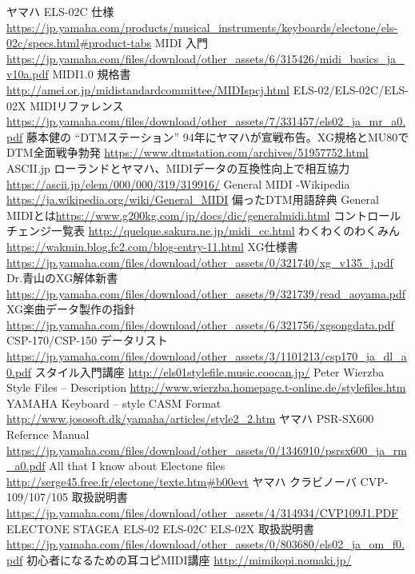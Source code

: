 \documentclass[uplatex, 10pt, dvipdfmx]{jsarticle}
\numberwithin{equation}{section}
\begin{document}
\begin{thebibliography}{99}
 ヤマハ ELS-02C 仕様\url{https://jp.yamaha.com/products/musical_instruments/keyboards/electone/els-02c/specs.html#product-tabs}
 MIDI 入門\url{https://jp.yamaha.com/files/download/other_assets/6/315426/midi_basics_ja_v10a.pdf}
 MIDI1.0 規格書 \url{http://amei.or.jp/midistandardcommittee/MIDIspcj.html}
 ELS-02/ELS-02C/ELS-02X MIDIリファレンス \url{https://jp.yamaha.com/files/download/other_assets/7/331457/els02_ja_mr_a0.pdf}
 藤本健の ``DTMステーション'' 94年にヤマハが宣戦布告。XG規格とMU80でDTM全面戦争勃発 \url{https://www.dtmstation.com/archives/51957752.html}
 ASCII.jp ローランドとヤマハ、MIDIデータの互換性向上で相互協力 \url{https://ascii.jp/elem/000/000/319/319916/}
 General MIDI -Wikipedia \url{https://ja.wikipedia.org/wiki/General_MIDI}
 偏ったDTM用語辞典 General MIDIとは\url{https://www.g200kg.com/jp/docs/dic/generalmidi.html}
 コントロールチェンジ一覧表 \url{http://quelque.sakura.ne.jp/midi_cc.html}
 わくわくのわくみん \url{https://wakmin.blog.fc2.com/blog-entry-11.html}
 XG仕様書 \url{https://jp.yamaha.com/files/download/other_assets/0/321740/xg_v135_j.pdf}
 Dr.青山のXG解体新書 \url{https://jp.yamaha.com/files/download/other_assets/9/321739/read_aoyama.pdf}
 XG楽曲データ製作の指針 \url{https://jp.yamaha.com/files/download/other_assets/6/321756/xgsongdata.pdf}
 CSP-170/CSP-150 データリスト \url{https://jp.yamaha.com/files/download/other_assets/3/1101213/csp170_ja_dl_a0.pdf}
 スタイル入門講座 \url{http://els01stylefile.music.coocan.jp/}
 Peter Wierzba Style Files -- Description \url{http://www.wierzba.homepage.t-online.de/stylefiles.htm}
 YAMAHA Keyboard -- style CASM Format \url{http://www.jososoft.dk/yamaha/articles/style2_2.htm}
 ヤマハ PSR-SX600 Refernce Manual \url{https://jp.yamaha.com/files/download/other_assets/0/1346910/psrsx600_ja_rm_a0.pdf}
 All that I know about Electone files \url{http://serge45.free.fr/electone/texte.htm#b00evt}
 ヤマハ クラビノーバ CVP-109/107/105 取扱説明書 \url{https://jp.yamaha.com/files/download/other_assets/4/314934/CVP109J1.PDF}
 ELECTONE STAGEA ELS-02 ELS-02C ELS-02X 取扱説明書 \url{https://jp.yamaha.com/files/download/other_assets/0/803680/els02_ja_om_f0.pdf}
 初心者になるための耳コピMIDI講座 \url{http://mimikopi.nomaki.jp/}

\end{thebibliography}
\end{document}
